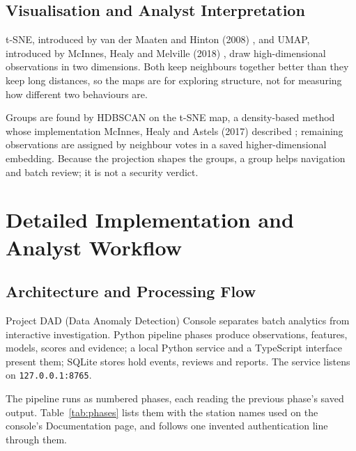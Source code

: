 \documentclass[11pt,a4paper]{article}
\begin{document}
\subsection{Visualisation and Analyst Interpretation}

t-SNE, introduced by van der Maaten and Hinton (2008) \cite{ref7}, and UMAP, introduced by McInnes, Healy and Melville (2018) \cite{ref8}, draw high-dimensional observations in two dimensions. Both keep neighbours together better than they keep long distances, so the maps are for exploring structure, not for measuring how different two behaviours are.

Groups are found by HDBSCAN on the t-SNE map, a density-based method whose implementation McInnes, Healy and Astels (2017) described \cite{ref9}; remaining observations are assigned by neighbour votes in a saved higher-dimensional embedding. Because the projection shapes the groups, a group helps navigation and batch review; it is not a security verdict.

\clearpage
\section{Detailed Implementation and Analyst Workflow}
\label{app:implementation}

\subsection{Architecture and Processing Flow}

Project DAD (Data Anomaly Detection) Console separates batch analytics from interactive investigation. Python pipeline phases produce observations, features, models, scores and evidence; a local Python service and a TypeScript interface present them; SQLite stores hold events, reviews and reports. The service listens on \nolinkurl{127.0.0.1:8765}.

The pipeline runs as numbered phases, each reading the previous phase's saved output. Table~\ref{tab:phases} lists them with the station names used on the console's Documentation page, and follows one invented authentication line through them.
\end{document}
